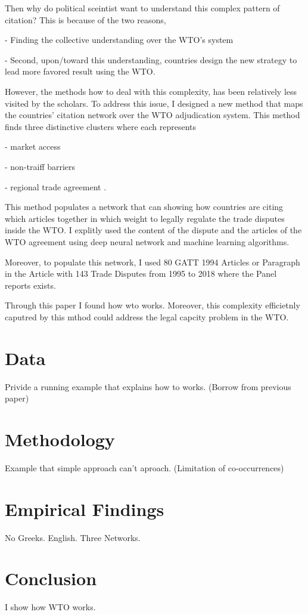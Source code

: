 \documentclass[12pt,letterpaper]{article}
\begin{document}
Then why do political sceintist want to understand this complex pattern of citation? This is because of the two reasons,

- Finding the collective understanding over the WTO's system

- Second, upon/toward this understanding, countries design the new strategy to lead more favored result using the WTO.

However, the methods how to deal with this complexity, has been relatively less visited by the scholars. To address this issue, I designed
a new method that maps the countries' citation network over the WTO adjudication system. This method finds three distinctive clusters where each represents

- market access

- non-traiff barriers

- regional trade agreement
.

This method populates a network that can showing how countries are citing which articles together in which weight to legally regulate the trade disputes inside the WTO.
I explitly used the content of the dispute and the articles of the WTO agreement using deep neural network and machine learning algorithms.

Moreover, to populate this network, I used 80 GATT 1994 Articles or Paragraph in the Article with 143 Trade Disputes from 1995 to 2018 where the Panel reports exists.

Through this paper I found how wto works.
Moreover, this complexity efficietnly caputred by this mthod could address the legal capcity problem in the WTO.

\section{Data}
Privide a running example that explains how to works. (Borrow from previous paper)

\section{Methodology}
Example that simple approach can't aproach. (Limitation of co-occurrences)

\section{Empirical Findings}
No Greeks. English. Three Networks.

\section{Conclusion}
I show how WTO works.
\end{document}
